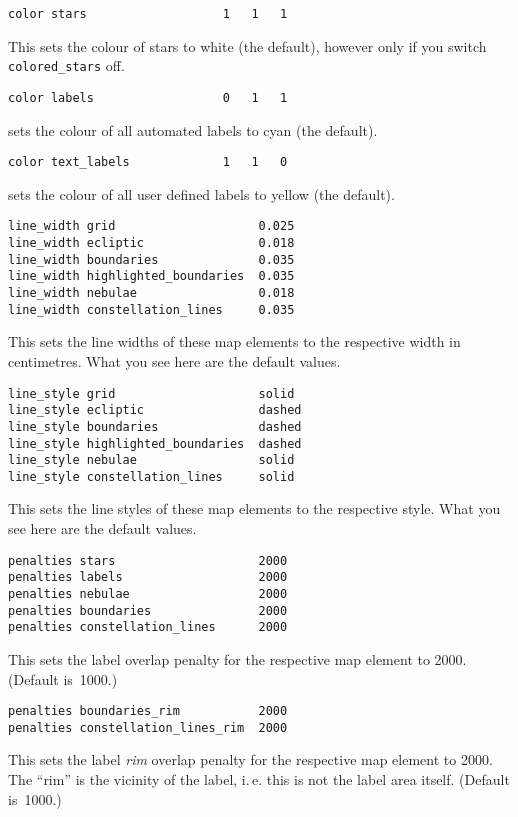 \documentclass{article}
\newcommand{\subskip}{\bigskip\medskip}
\newcommand{\subsubskip}{\bigskip}
\begin{document}
\begin{multicols*}{3}
\begin{lstlisting}
color stars                   1   1   1
\end{lstlisting}
This sets the colour of stars to white (the default), however only if you
switch \lstinline{colored_stars} off.\subsubskip

\begin{lstlisting}
color labels                  0   1   1
\end{lstlisting}
sets the colour of all automated labels to cyan (the default).\subsubskip

\begin{lstlisting}
color text_labels             1   1   0
\end{lstlisting}
sets the colour of all user defined labels to yellow (the default).\subskip

\begin{lstlisting}
line_width grid                    0.025
line_width ecliptic                0.018
line_width boundaries              0.035
line_width highlighted_boundaries  0.035
line_width nebulae                 0.018
line_width constellation_lines     0.035
\end{lstlisting}
This sets the line widths of these map elements to the respective width in
centimetres.  What you see here are the default values.\subskip

\begin{lstlisting}
line_style grid                    solid
line_style ecliptic                dashed
line_style boundaries              dashed
line_style highlighted_boundaries  dashed
line_style nebulae                 solid
line_style constellation_lines     solid
\end{lstlisting}
This sets the line styles of these map elements to the respective style.
What you see here are the default values.%

\iffalse
\begin{lstlisting}
penalties stars                    2000
penalties labels                   2000
penalties nebulae                  2000
penalties boundaries               2000
penalties constellation_lines      2000
\end{lstlisting}
This sets the label overlap penalty for the respective map element to 2000.
(Default is~1000.)\subsubskip

\begin{lstlisting}
penalties boundaries_rim           2000
penalties constellation_lines_rim  2000
\end{lstlisting}
This sets the label \emph{rim} overlap penalty for the respective map element
to 2000.  The ``rim'' is the vicinity of the label, i.\,e. this is not the
label area itself.  (Default is~1000.)\subsubskip



\end{multicols*}
\end{document}
